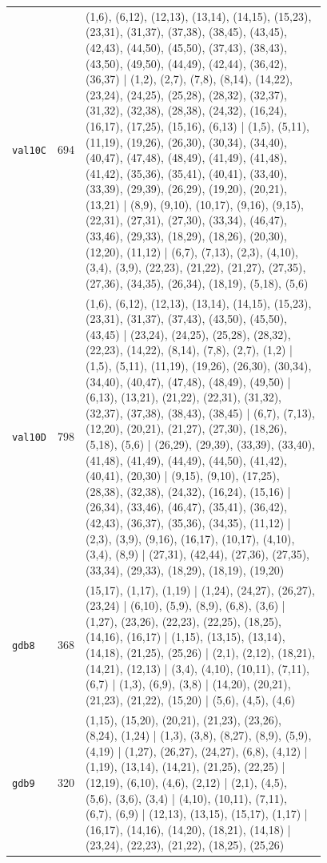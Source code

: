 \begin{landscape}
\begin{longtable}{lr>{\tiny\raggedright\arraybackslash}p{0.78\linewidth}}
\texttt{val10C} & 694 & (1,6), (6,12), (12,13), (13,14), (14,15), (15,23), (23,31), (31,37), (37,38), (38,45), (43,45), (42,43), (44,50), (45,50), (37,43), (38,43), (43,50), (49,50), (44,49), (42,44), (36,42), (36,37) | (1,2), (2,7), (7,8), (8,14), (14,22), (23,24), (24,25), (25,28), (28,32), (32,37), (31,32), (32,38), (28,38), (24,32), (16,24), (16,17), (17,25), (15,16), (6,13) | (1,5), (5,11), (11,19), (19,26), (26,30), (30,34), (34,40), (40,47), (47,48), (48,49), (41,49), (41,48), (41,42), (35,36), (35,41), (40,41), (33,40), (33,39), (29,39), (26,29), (19,20), (20,21), (13,21) | (8,9), (9,10), (10,17), (9,16), (9,15), (22,31), (27,31), (27,30), (33,34), (46,47), (33,46), (29,33), (18,29), (18,26), (20,30), (12,20), (11,12) | (6,7), (7,13), (2,3), (4,10), (3,4), (3,9), (22,23), (21,22), (21,27), (27,35), (27,36), (34,35), (26,34), (18,19), (5,18), (5,6) \\[2pt]
\texttt{val10D} & 798 & (1,6), (6,12), (12,13), (13,14), (14,15), (15,23), (23,31), (31,37), (37,43), (43,50), (45,50), (43,45) | (23,24), (24,25), (25,28), (28,32), (22,23), (14,22), (8,14), (7,8), (2,7), (1,2) | (1,5), (5,11), (11,19), (19,26), (26,30), (30,34), (34,40), (40,47), (47,48), (48,49), (49,50) | (6,13), (13,21), (21,22), (22,31), (31,32), (32,37), (37,38), (38,43), (38,45) | (6,7), (7,13), (12,20), (20,21), (21,27), (27,30), (18,26), (5,18), (5,6) | (26,29), (29,39), (33,39), (33,40), (41,48), (41,49), (44,49), (44,50), (41,42), (40,41), (20,30) | (9,15), (9,10), (17,25), (28,38), (32,38), (24,32), (16,24), (15,16) | (26,34), (33,46), (46,47), (35,41), (36,42), (42,43), (36,37), (35,36), (34,35), (11,12) | (2,3), (3,9), (9,16), (16,17), (10,17), (4,10), (3,4), (8,9) | (27,31), (42,44), (27,36), (27,35), (33,34), (29,33), (18,29), (18,19), (19,20) \\[2pt]
\texttt{gdb8} & 368 & (15,17), (1,17), (1,19) | (1,24), (24,27), (26,27), (23,24) | (6,10), (5,9), (8,9), (6,8), (3,6) | (1,27), (23,26), (22,23), (22,25), (18,25), (14,16), (16,17) | (1,15), (13,15), (13,14), (14,18), (21,25), (25,26) | (2,1), (2,12), (18,21), (14,21), (12,13) | (3,4), (4,10), (10,11), (7,11), (6,7) | (1,3), (6,9), (3,8) | (14,20), (20,21), (21,23), (21,22), (15,20) | (5,6), (4,5), (4,6) \\[2pt]
\texttt{gdb9} & 320 & (1,15), (15,20), (20,21), (21,23), (23,26), (8,24), (1,24) | (1,3), (3,8), (8,27), (8,9), (5,9), (4,19) | (1,27), (26,27), (24,27), (6,8), (4,12) | (1,19), (13,14), (14,21), (21,25), (22,25) | (12,19), (6,10), (4,6), (2,12) | (2,1), (4,5), (5,6), (3,6), (3,4) | (4,10), (10,11), (7,11), (6,7), (6,9) | (12,13), (13,15), (15,17), (1,17) | (16,17), (14,16), (14,20), (18,21), (14,18) | (23,24), (22,23), (21,22), (18,25), (25,26) \\[2pt]

\end{longtable}
\end{landscape}
